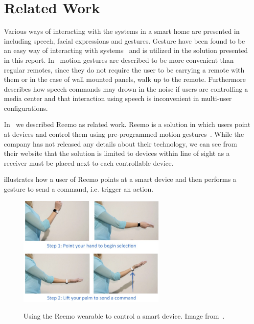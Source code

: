 \section{Related Work}
\label{sec:related-work}

Various ways of interacting with the systems in a smart home are presented in~\cite[pp. 9-10]{cook2007smart} including speech, facial expressions and gestures. Gesture have been found to be an easy way of interacting with systems~\cite[p. 6]{rahman2011motion} and is utilized in the solution presented in this report. In~\cite[pp. 2-3]{starner2000gesture} motion gestures are described to be more convenient than regular remotes, since they do not require the user to be carrying a remote with them or in the case of wall mounted panels, walk up to the remote. Furthermore~\cite{starner2000gesture} describes how speech commands may drown in the noise if users are controlling a media center and that interaction using speech is inconvenient in multi-user configurations.

In~\cite[pp. 9-11]{prespecialisation} we described Reemo as related work. Reemo is a solution in which users point at devices and control them using pre-programmed motion gestures~\cite{reemo:about}. While the company has not released any details about their technology, we can see from their website that the solution is limited to devices within line of sight as a receiver must be placed next to each controllable device.

 illustrates how a user of Reemo points at a smart device and then performs a gesture to send a command, i.e. trigger an action.

\begin{figure}[!hbt]
\centering
\includegraphics[width=0.65\textwidth]{images/reemo}
\label{fig:introduction:gesture-control:reemo}
\caption{Using the Reemo wearable to control a smart device. Image from~\cite{prespecialisation}.}
\end{figure}

